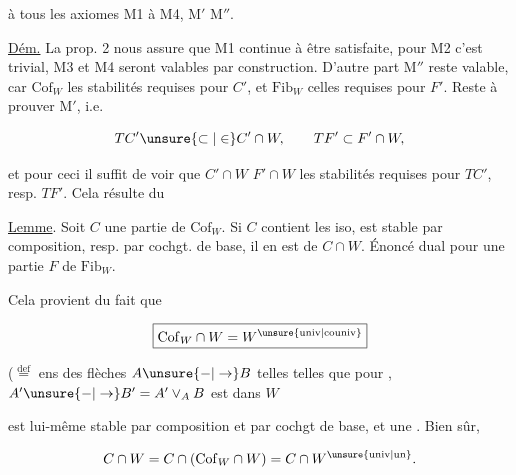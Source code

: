 

à tous les axiomes M1 à M4, M$'$ M$''$.

\uline{Dém.} La prop. 2 nous assure que M1 continue à être satisfaite,  pour M2 c'est trivial,  M3 et M4 seront valables par construction. D'autre part M$''$ reste valable, car $\mathrm{Cof}_W$  les stabilités requises pour $C'$, et $\mathrm{Fib}_W$ celles requises pour $F'$. Reste à prouver M$'$, i.e.

\[ TC'\unsure{\subset|\in} C'\cap W,\qquad TF'\subset F'\cap W, \]

et pour ceci il suffit de voir  que $C'\cap W$  $F'\cap W$  les stabilités requises pour $TC'$, resp. $TF'$. Cela résulte du

\uline{Lemme}. Soit $C$ une partie de $\mathrm{Cof}_W$. Si $C$ contient les iso,   est stable par composition, resp.  par cochgt. de base, il en est de \unsure{$=$} $C\cap W$. Énoncé dual pour une partie $F$ de $\mathrm{Fib}_W$.

Cela provient du fait que

\[ \boxed{\mathrm{Cof}_W\cap W=W^{\unsure{\mathrm{univ}|\mathrm{couniv}}}} \]


($\overset{\mathrm{def}}{=}$ ens des flèches $A\unsure{-|\to}B$ telles telles que pour  , $A'\unsure{-|\to}B'=A'\vee_A B$ est dans $W$

est lui-même stable par composition et par cochgt de base, et une  . Bien sûr, 

\[ C\cap W=C\cap(\mathrm{Cof}_W\cap W)=C\cap W^{\unsure{\mathrm{univ}|\mathrm{un}}}. \]


